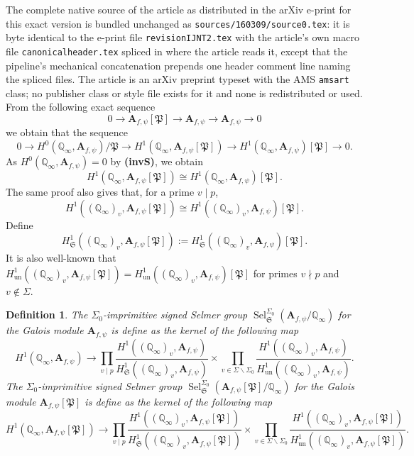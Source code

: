\documentclass[10pt,a4paper]{amsart}
\newtheorem{definition}[theorem]{Definition}
\newcommand{\ur}{\mathrm{un}}
\newcommand{\Q}{\mathbb{Q}}
\newcommand{\fS}{\mathfrak{S}}
\newcommand{\bA}{\mathbf{A}}
\newcommand{\Sel}{\operatorname{Sel}}
\begin{document}
The complete native source of the article as distributed in the arXiv e-print for this exact version is bundled unchanged as \texttt{sources/160309/source0.tex}: it is byte identical to the e-print file \texttt{revisionIJNT2.tex} with the article's own macro file \texttt{canonicalheader.tex} spliced in where the article reads it, except that the pipeline's mechanical concatenation prepends one header comment line naming the spliced files. The article is an arXiv preprint typeset with the AMS \texttt{amsart} class; no publisher class or style file exists for it and none is redistributed or used.
From the following exact sequence 
$$0 \rightarrow \bA_{f, \psi}[\mathfrak{P}] \rightarrow \bA_{f, \psi} \rightarrow \bA_{f, \psi} \rightarrow 0 $$
we obtain that the sequence 
$$ 0 \rightarrow H^0(\Q_\infty, \bA_{f, \psi})/\mathfrak{P} \rightarrow H^1(\Q_\infty, \bA_{f, \psi}[\mathfrak{P}] ) \rightarrow H^1(\Q_\infty,\bA_{f, \psi})[\mathfrak{P}] \rightarrow 0. $$
As $H^0(\Q_\infty, \bA_{f, \psi})=0$ by \textbf{(invS)}, we obtain $$H^1(\Q_\infty, \bA_{f, \psi}[\mathfrak{P}] ) \cong H^1(\Q_\infty,\bA_{f, \psi})[\mathfrak{P}]. $$ The same proof also gives that, for a prime $v \mid p$, 
$$H^1((\Q_\infty)_v, \bA_{f, \psi}[\mathfrak{P}] ) \cong H^1((\Q_\infty)_v,\bA_{f, \psi})[\mathfrak{P}]. $$
Define $$H^1_{\fS}((\Q_\infty)_v, \bA_{f, \psi}[\mathfrak{P}] ):=H^1_{\fS}((\Q_\infty)_v, \bA_{f, \psi})[\mathfrak{P}].$$
It is also well-known that $H^1_{\ur}((\Q_\infty)_v,\bA_{f, \psi}[\mathfrak{P}])=H^1_{\ur}((\Q_\infty)_v,\bA_{f, \psi})[\mathfrak{P}]$ for primes $v\nmid p$ and $v\not\in \Sigma.$ 
\begin{definition}\label{def:imprimitive} The $\Sigma_0$-imprimitive signed Selmer group $\Sel_{\fS}^{\Sigma_0}(\bA_{f,\psi}/\Q_\infty)$ for the Galois module $\bA_{f,\psi}$ is define as the kernel of the following map 
$$H^1(\Q_\infty,\bA_{f, \psi}) \rightarrow \prod_{v \mid p} \frac{H^1((\Q_\infty)_v,\bA_{f, \psi})}{H_{\fS}^1((\Q_\infty)_v,\bA_{f, \psi})}  \times \prod_{v \in \Sigma\backslash \Sigma_0}\frac{H^1((\Q_\infty)_v,\bA_{f, \psi})}{H^1_{\ur}((\Q_\infty)_v,\bA_{f, \psi})}.$$
The $\Sigma_0$-imprimitive signed Selmer group $\Sel_{\fS}^{\Sigma_0}(\bA_{f,\psi}[\mathfrak{P}]/\Q_\infty)$ for the Galois module $\bA_{f,\psi}[\mathfrak{P}]$ is define as the kernel of the following map 
$$H^1(\Q_\infty,\bA_{f, \psi}[\mathfrak{P}]) \rightarrow \prod_{v \mid p} \frac{H^1((\Q_\infty)_v,\bA_{f, \psi}[\mathfrak{P}])}{H_{\fS}^1((\Q_\infty)_v,\bA_{f, \psi}[\mathfrak{P}])}  \times \prod_{v \in \Sigma\backslash \Sigma_0}\frac{H^1((\Q_\infty)_v,\bA_{f, \psi}[\mathfrak{P}])}{H^1_{\ur}((\Q_\infty)_v,\bA_{f, \psi}[\mathfrak{P}])}.$$  
\end{definition}
\end{document}
